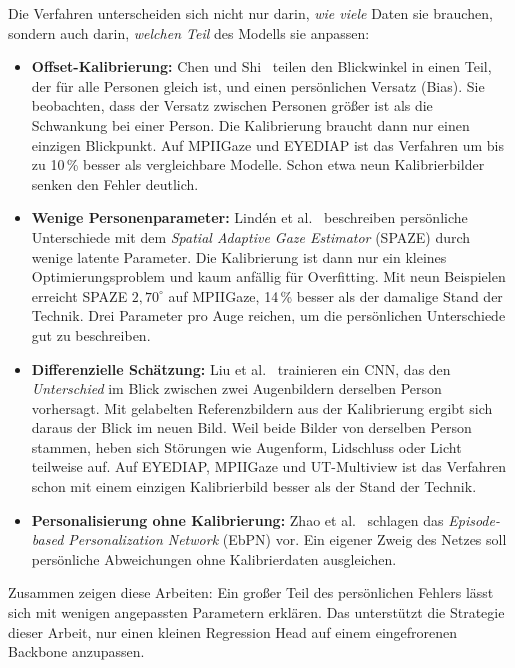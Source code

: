 Die Verfahren unterscheiden sich nicht nur darin, \emph{wie viele} Daten sie
brauchen, sondern auch darin, \emph{welchen Teil} des Modells sie anpassen:
\begin{itemize}
  \item \textbf{Offset-Kalibrierung:} Chen und Shi~\cite{chen2020offset}
        teilen den Blickwinkel in einen Teil, der für alle Personen gleich
        ist, und einen persönlichen Versatz (Bias). Sie beobachten, dass der
        Versatz zwischen Personen größer ist als die Schwankung bei einer
        Person. Die Kalibrierung braucht dann nur einen einzigen Blickpunkt.
        Auf MPIIGaze und EYEDIAP ist das Verfahren um bis zu 10\,\% besser als
        vergleichbare Modelle. Schon etwa neun Kalibrierbilder senken den
        Fehler deutlich.
  \item \textbf{Wenige Personenparameter:} Lindén et
        al.~\cite{linden2019spaze} beschreiben persönliche Unterschiede mit dem
        \emph{Spatial Adaptive Gaze Estimator} (SPAZE) durch wenige latente
        Parameter. Die Kalibrierung ist dann nur ein kleines
        Optimierungsproblem und kaum anfällig für Overfitting. Mit neun
        Beispielen erreicht SPAZE $2,70^\circ$ auf MPIIGaze, 14\,\% besser als
        der damalige Stand der Technik. Drei Parameter pro Auge reichen, um
        die persönlichen Unterschiede gut zu beschreiben.
  \item \textbf{Differenzielle Schätzung:} Liu et
        al.~\cite{liu2021differential} trainieren ein CNN, das den
        \emph{Unterschied} im Blick zwischen zwei Augenbildern derselben Person
        vorhersagt. Mit gelabelten Referenzbildern aus der Kalibrierung ergibt
        sich daraus der Blick im neuen Bild. Weil beide Bilder von derselben
        Person stammen, heben sich Störungen wie Augenform, Lidschluss oder
        Licht teilweise auf. Auf EYEDIAP, MPIIGaze und UT-Multiview ist das
        Verfahren schon mit einem einzigen Kalibrierbild besser als der Stand
        der Technik.
  \item \textbf{Personalisierung ohne Kalibrierung:} Zhao et
        al.~\cite{zhao2022ebpn} schlagen das \emph{Episode-based
        Personalization Network} (EbPN) vor. Ein eigener Zweig des Netzes soll
        persönliche Abweichungen ohne Kalibrierdaten ausgleichen.
\end{itemize}
Zusammen zeigen diese Arbeiten: Ein großer Teil des persönlichen Fehlers lässt
sich mit wenigen angepassten Parametern erklären. Das unterstützt die Strategie
dieser Arbeit, nur einen kleinen Regression Head auf einem eingefrorenen
Backbone anzupassen.

